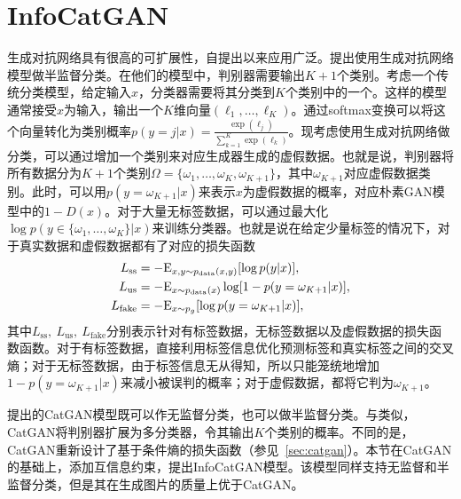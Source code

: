 \section{InfoCatGAN}\label{sec:icg}
生成对抗网络具有很高的可扩展性，自提出以来应用广泛。\citet{salimans2016improved,odena2016semi}提出使用生成对抗网络模型做半监督分类。在他们的模型中，判别器需要输出$K+1$个类别。考虑一个传统分类模型，给定输入$x$，分类器需要将其分类到$K$个类别中的一个。这样的模型通常接受$x$为输入，输出一个$K$维向量$(\ell_1, \dots, \ell_K)$。通过softmax变换可以将这个向量转化为类别概率$p(y=j|x) = \frac{\exp(\ell_j)}{\sum_{k=1}^K \exp(\ell_k)}$。现考虑使用生成对抗网络做分类，可以通过增加一个类别来对应生成器生成的虚假数据。也就是说，判别器将所有数据分为$K+1$个类别$\Omega = \{\omega_1, \dots, \omega_K, \omega_{K+1}\}$，其中$\omega_{K+1}$对应虚假数据类别。此时，可以用$p(y=\omega_{K+1}|x)$来表示$x$为虚假数据的概率，对应朴素GAN模型中的$1 - D(x)$。对于大量无标签数据，可以通过最大化$\log p(y\in \{\omega_1,\dots,\omega_K\} | x)$来训练分类器。也就是说在给定少量标签的情况下，对于真实数据和虚假数据都有了对应的损失函数
\begin{align}
  L_{\text{ss}} &= -\text{E}_{x,y \sim p_{\text{data}}(x,y)}[\log p(y|x)], \\
  L_{\text{us}} &= -\text{E}_{x\sim p_{\text{data}}(x)}\log [1 - p(y=\omega_{K+1} | x)], \\
  L_{\text{fake}} &= -\text{E}_{x\sim p_g}[\log p(y=\omega_{K+1} | x)],
\end{align}
其中$L_{\text{ss}}, ~L_{\text{us}}, ~L_{\text{fake}}$分别表示针对有标签数据，无标签数据以及虚假数据的损失函数函数。对于有标签数据，直接利用标签信息优化预测标签和真实标签之间的交叉熵；对于无标签数据，由于标签信息无从得知，所以只能笼统地增加$1-p(y=\omega_{K+1}|x)$来减小被误判的概率；对于虚假数据，都将它判为$\omega_{K+1}$。

\citet{springenberg2015unsupervised}提出的CatGAN模型既可以作无监督分类，也可以做半监督分类。与\citet{salimans2016improved,odena2016semi}类似，CatGAN将判别器扩展为多分类器，令其输出$K$个类别的概率。不同的是，CatGAN重新设计了基于条件熵的损失函数（参见~\ref{sec:catgan}）。本节在CatGAN的基础上，添加互信息约束，提出InfoCatGAN模型。该模型同样支持无监督和半监督分类，但是其在生成图片的质量上优于CatGAN。



